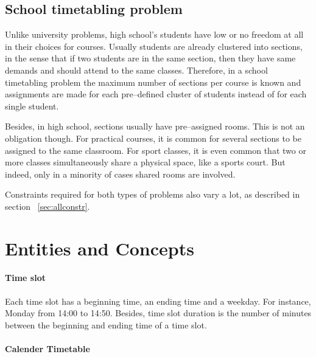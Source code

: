 \subsection{School timetabling problem}
\label{subsec:school}

Unlike university problems, high school's students have low or no freedom at all in their choices for courses. Usually students are already clustered into sections, in the sense that if two students are in the same section, then they have same demands and should attend to the same classes. Therefore, in a school timetabling problem the maximum number of sections per course is known and assignments are made for each pre--defined cluster of students instead of for each single student.

Besides, in high school, sections usually have pre--assigned rooms. This is not an obligation though. For practical courses, it is common for several sections to be assigned to the same classroom. For sport classes, it is even common that two or more classes simultaneously share a physical space, like a sports court. But indeed, only in a minority of cases shared rooms are involved.

Constraints required for both types of problems also vary a lot, as described in section ~\ref{sec:allconstr}.




\section{Entities and Concepts}
\label{sec:entities}


\paragraph{Time slot}
\label{deftimeslot}

Each time slot has a beginning time, an ending time and a weekday. For instance, Monday from 14:00 to 14:50. Besides, time slot duration is the number of minutes between the beginning and ending time of a time slot.


\paragraph{Calender Timetable}
\label{deftimetable}

